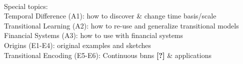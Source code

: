{\ }\\

Special topics:\\

 
\noindent\hspace*{1cm}Temporal Difference (A1): how to discover \& change time basis/scale\\
\hspace*{1cm}Transitional Learning (A2): how to re-use and generalize transitional models\\
\hspace*{1cm}Financial Systems (A3): how to use with financial systems\\
\hspace*{1cm}Origins (E1-E4): original examples and sketches\\
\hspace*{1cm}Transitional Encoding (E5-E6): Continuous bnns \textbf{[?]} \& applications
 

 
